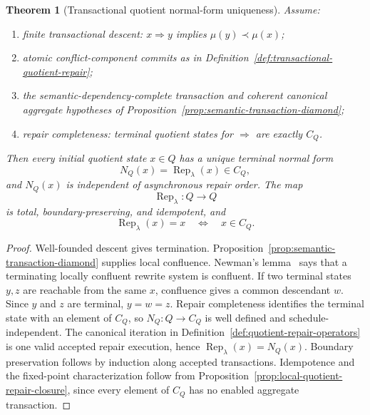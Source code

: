 \documentclass[11pt]{article}
\newtheorem{theorem}{Theorem}[section]
\begin{document}
\begin{theorem}[Transactional quotient normal-form uniqueness]\label{thm:confluence}
Assume:
\begin{enumerate}[label=\textup{(\roman*)},leftmargin=2em]
\item finite transactional descent: \(x\Rightarrow y\) implies \(\mu(y)\prec\mu(x)\);
\item atomic conflict-component commits as in Definition~\ref{def:transactional-quotient-repair};
\item the semantic-dependency-complete transaction and coherent canonical aggregate hypotheses of
Proposition~\ref{prop:semantic-transaction-diamond};
\item repair completeness: terminal quotient states for \(\Rightarrow\) are exactly \(C_Q\).
\end{enumerate}
Then every initial quotient state \(x\in Q\) has a unique terminal normal form
\[
N_Q(x)=\operatorname{Rep}_\lambda(x)\in C_Q,
\]
and \(N_Q(x)\) is independent of asynchronous repair order.  The map
\[
\operatorname{Rep}_\lambda:Q\to Q
\]
is total, boundary-preserving, and idempotent, and
\[
\operatorname{Rep}_\lambda(x)=x
\quad\Longleftrightarrow\quad
x\in C_Q.
\]
\end{theorem}

\begin{proof}
Well-founded descent gives termination. Proposition~\ref{prop:semantic-transaction-diamond}
supplies local confluence. Newman's lemma~\cite{newman42} says that a terminating locally confluent
rewrite system is confluent. If two terminal states \(y,z\) are reachable from the same \(x\),
confluence gives a common descendant \(w\). Since \(y\) and \(z\) are terminal, \(y=w=z\). Repair
completeness identifies the terminal state with an element of \(C_Q\), so \(N_Q:Q\to C_Q\) is
well defined and schedule-independent.  The canonical iteration in
Definition~\ref{def:quotient-repair-operators} is one valid accepted repair execution, hence
\(\operatorname{Rep}_\lambda(x)=N_Q(x)\).  Boundary preservation follows by induction along
accepted transactions.  Idempotence and the fixed-point characterization follow from
Proposition~\ref{prop:local-quotient-repair-closure}, since every element of \(C_Q\) has no enabled
aggregate transaction.
\end{proof}
\end{document}
